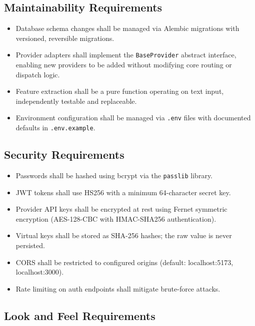 \documentclass[12pt,a4paper]{report}
\begin{document}
\subsection{Maintainability Requirements}

\begin{itemize}[nosep]
    \item Database schema changes shall be managed via Alembic migrations with versioned, reversible migrations.
    \item Provider adapters shall implement the \texttt{BaseProvider} abstract interface, enabling new providers to be added without modifying core routing or dispatch logic.
    \item Feature extraction shall be a pure function operating on text input, independently testable and replaceable.
    \item Environment configuration shall be managed via \texttt{.env} files with documented defaults in \texttt{.env.example}.
\end{itemize}

\subsection{Security Requirements}

\begin{itemize}[nosep]
    \item Passwords shall be hashed using bcrypt via the \texttt{passlib} library.
    \item JWT tokens shall use HS256 with a minimum 64-character secret key.
    \item Provider API keys shall be encrypted at rest using Fernet symmetric encryption (AES-128-CBC with HMAC-SHA256 authentication).
    \item Virtual keys shall be stored as SHA-256 hashes; the raw value is never persisted.
    \item CORS shall be restricted to configured origins (default: localhost:5173, localhost:3000).
    \item Rate limiting on auth endpoints shall mitigate brute-force attacks.
\end{itemize}

\subsection{Look and Feel Requirements}
\end{document}
